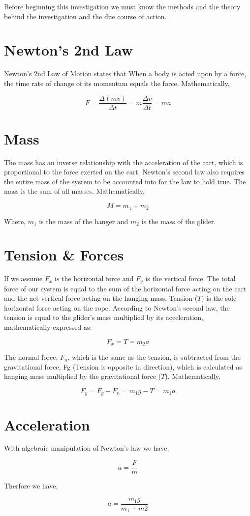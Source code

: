 {Before beginning this investigation we must know the methods and the theory behind the investigation and the due course of action.}

\section{{Newton's 2nd Law}}

	{Newton's 2nd Law of Motion states that When a body is acted upon by a force, the time rate of change of its momentum equals the force. Mathematically,}

		$$F = \frac{\Delta(mv)}{\Delta t} = m\frac{\Delta v}{\Delta t} = ma$$

\section{{Mass}}

	{The mass has an inverse relationship with the acceleration of the cart, which is proportional to the force exerted on the cart. Newton's second law also requires the entire mass of the system to be accounted into for the law to hold true. The mass is the sum of all masses. Mathematically,}

		$$M = m_{1} + m_{2}$$

	{Where, $m_{1}$ is the mass of the hanger and $m_{2}$ is the mass of the glider.}

\section{{Tension \& Forces}}

	{If we assume $F_{x}$ is the horizontal force and $F_{y}$ is the vertical force. The total force of our system is equal to the sum of the horizontal force acting on the cart and the net vertical force acting on the hanging mass. Tension ($T$) is the sole horizontal force acting on the rope. According to Newton's second law, the tension is equal to the glider's mass multiplied by its acceleration, mathematically expressed as:}
	
		$$F_{x} = T = m_{2}a$$	
	
	{The normal force, $F_{n}$, which is the same as the tension, is subtracted from the gravitational force, Fg (Tension is opposite in direction), which is calculated as hanging mass multiplied by the gravitational force ($T$). Mathematically,}	
	
		$$F_{y} = F_{g} - F_{n} = m_{1}g - T = m_{1}a$$	
		
\section{{Acceleration}}

	{With algebraic manipulation of Newton's law we have,}
	
		$$a = \frac{F}{m}$$	
	
	{Therfore we have,}

		$$a = \frac{m_{1}g}{m_{1} + m{2}}$$


